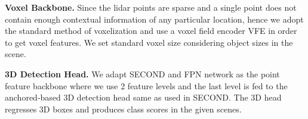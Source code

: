 \documentclass[10pt,twocolumn,letterpaper]{article}
\begin{document}
\textbf{Voxel Backbone.}
Since the lidar points are sparse and a single point does not contain enough contextual information of any particular location, hence we adopt the standard method of voxelization and use a voxel field encoder VFE \cite{zhou2018voxelnet} in order to get voxel features. We set standard voxel size considering object sizes in the scene.

\textbf{3D Detection Head.}
We adapt SECOND \cite{yan2018second} and FPN network \cite{lin2017feature} as the point feature backbone where we use 2 feature levels and the last level is fed to the anchored-based 3D detection head same as used in SECOND. The 3D head regresses 3D boxes and produces class scores in the given scenes. 
\end{document}
